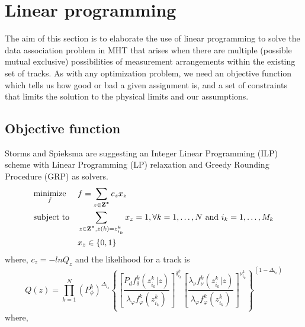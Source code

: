 \section{Linear programming}
The aim of this section is to elaborate the use of linear programming to solve the data association problem in MHT that arises when there are multiple (possible mutual exclusive) possibilities of measurement arrangements within the existing set of tracks. As with any optimization problem, we need an objective function which tells us how good or bad a given assignment is, and a set of constraints that limits the solution to the physical limits and our assumptions.

\subsection{Objective function}
Storms and Spieksma \cite{Storms2003} are suggesting an Integer Linear Programming (ILP) scheme with Linear Programming (LP) relaxation and Greedy Rounding Procedure (GRP) as solvers. 
\begin{equation}
\begin{aligned}
& \underset{f}{\text{minimize}}
& & f=\sum_{z \in \boldsymbol{\mathbf{Z^*}}} c_z x_z \\
& \text{subject to}
& & \sum_{z \in \boldsymbol{\mathbf{Z^*}} , z(k)=z_{i_k}^k} x_z=1 , \forall k = 1, \ldots, N   \text{ and } i_k = 1, \ldots, M_k  \\
&&& x_z \in \{0,1\}
\end{aligned}
\end{equation}
where, $c_z = -lnQ_z$ and the likelihood for a track is
\begin{equation}
Q(z) = \prod_{k=1}^N (P_\phi^k)^{\Delta_{i_k}} \left \{ 
	\left[ \frac{P_d f_\delta^k (z_{i_k}^k | z)}{\lambda_\varphi f_\varphi^k(z_{i_k}^k)} \right]^{\delta_{i_k}^k} 	
	\left[ \frac{\lambda_\nu f_\nu^k(z_{i_k}^k|z)}{\lambda_\varphi f_\varphi^k(z_{i_k}^k)} \right]^{\nu_{i_k}^k}
	\right \}^{(1-\Delta_{i_k})}
\end{equation}
where,
